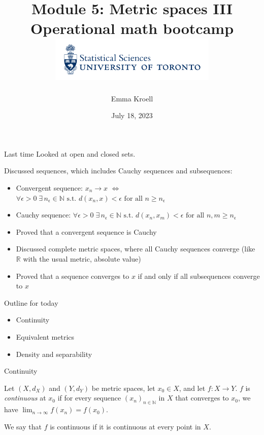 \documentclass [aspectratio=169]{beamer}
\title[]{Module 5: Metric spaces III \\ {\large Operational math bootcamp}\\ \includegraphics[width=8cm]{dept_logo.png}\vspace{-1em}}
\author[]{Emma Kroell}
\institute[]{University of Toronto}
\date{July 18, 2023}
\newcommand{\R}{{\mathbb{R}}}
\newcommand{\N}{{\mathbb{N}}}
\begin{document}
{
\begin{frame}
    \titlepage
\end{frame}
}


\begin{frame}{Last time}
Looked at open and closed sets.

\vspace{0.5em}

Discussed sequences, which includes Cauchy sequences and subsequences:
\vspace{0.5em}
	\begin{itemize}
	   \setlength\itemsep{0.6em}
	\item Convergent sequence: $x_n \to x$ $\Leftrightarrow$ $\forall \epsilon > 0 \; \exists \, n_\epsilon \in \N \text{ s.t. } d(x_n,x) < \epsilon \text{ for all } n \geq n_\epsilon$
	\item Cauchy sequence:  $ \forall \epsilon>0 \; \exists \, n_\epsilon \in \N \text{ s.t. } d(x_n,x_m) < \epsilon \text{ for all } n,m \geq n_\epsilon$
	\item Proved that a convergent sequence is Cauchy
	\item Discussed complete metric spaces, where all Cauchy sequences converge (like $\R$ with the usual metric, absolute value)
	\item Proved that a sequence converges to $x$ if and only if all subsequences converge to $x$
    \end{itemize}
\end{frame}

\begin{frame}{Outline for today}
    \begin{itemize}
      \setlength\itemsep{1em}
    	\item Continuity
	\item Equivalent metrics
	\item Density and separability
    \end{itemize}
\end{frame}


\begin{frame}{Continuity}
\begin{definition}
Let $(X,d_X)$ and $(Y,d_Y)$ be metric spaces, let $x_0 \in X$, and let $f:X\to Y$. $f$ is \emph{continuous} at $x_0$ if for every sequence $(x_n)_{n\in\N}$ in $X$ that converges to $x_0$, we have $\lim_{n\to\infty}f(x_n)=f(x_0)$.

\vspace{1em}

We say that $f$ is continuous if it is continuous at every point in $X$.
\end{definition}
\end{frame}
\end{document}
